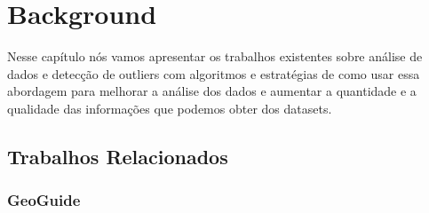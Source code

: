 \chapter{Background}


Nesse capítulo nós vamos apresentar os trabalhos existentes sobre análise de dados e detecção de outliers com algoritmos e estratégias de como usar essa abordagem para melhorar a análise dos dados e aumentar a quantidade e a qualidade das informações que podemos obter dos datasets.

\section{Trabalhos Relacionados}

\subsection{GeoGuide}


